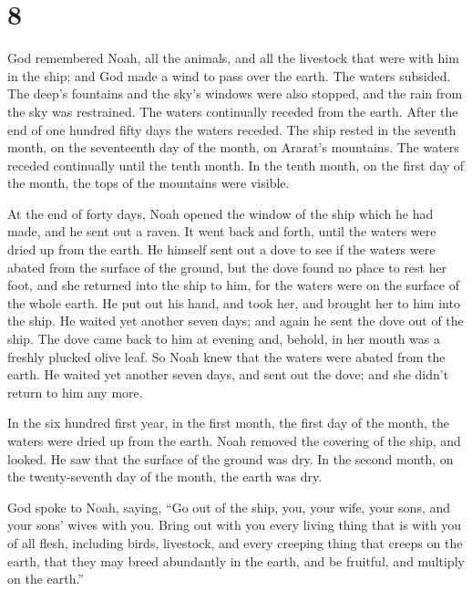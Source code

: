\hypertarget{section-7}{%
\section{8}\label{section-7}}

 God remembered Noah, all the animals, and all the
livestock that were with him in the ship; and God made a wind to pass
over the earth. The waters subsided.  The deep's fountains
and the sky's windows were also stopped, and the rain from the sky was
restrained.  The waters continually receded from the
earth. After the end of one hundred fifty days the waters receded.
 The ship rested in the seventh month, on the seventeenth
day of the month, on Ararat's mountains.  The waters
receded continually until the tenth month. In the tenth month, on the
first day of the month, the tops of the mountains were visible.

 At the end of forty days, Noah opened the window of the
ship which he had made,  and he sent out a raven. It went
back and forth, until the waters were dried up from the earth.
 He himself sent out a dove to see if the waters were
abated from the surface of the ground,  but the dove found
no place to rest her foot, and she returned into the ship to him, for
the waters were on the surface of the whole earth. He put out his hand,
and took her, and brought her to him into the ship.  He
waited yet another seven days; and again he sent the dove out of the
ship.  The dove came back to him at evening and, behold,
in her mouth was a freshly plucked olive leaf. So Noah knew that the
waters were abated from the earth.  He waited yet another
seven days, and sent out the dove; and she didn't return to him any
more.

 In the six hundred first year, in the first month, the
first day of the month, the waters were dried up from the earth. Noah
removed the covering of the ship, and looked. He saw that the surface of
the ground was dry.  In the second month, on the
twenty-seventh day of the month, the earth was dry.

 God spoke to Noah, saying,  ``Go out of
the ship, you, your wife, your sons, and your sons' wives with you.
 Bring out with you every living thing that is with you
of all flesh, including birds, livestock, and every creeping thing that
creeps on the earth, that they may breed abundantly in the earth, and be
fruitful, and multiply on the earth.''

